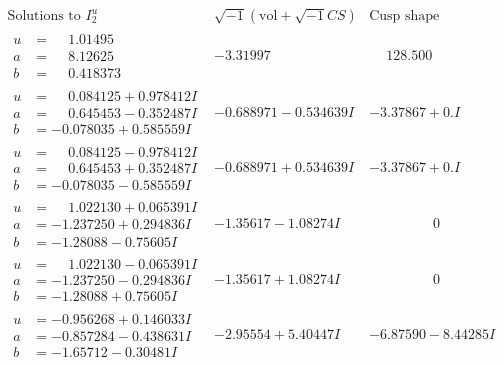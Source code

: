 \documentclass[1p]{elsarticle_modified}
\theoremstyle{definition}
\newcommand{\I}{\sqrt{-1}}
\begin{document}
$$\begin{array}{c|c|c}  
\text{Solutions to }I^u_{2}& \I (\text{vol} + \sqrt{-1}CS) & \text{Cusp shape}\\
 \hline 
\begin{aligned}
u &= \phantom{-}1.01495\phantom{ +0.000000I} \\
a &= \phantom{-}8.12625\phantom{ +0.000000I} \\
b &= \phantom{-}0.418373\phantom{ +0.000000I}\end{aligned}
 & -3.31997\phantom{ +0.000000I} & \phantom{-}128.500\phantom{ +0.000000I} \\ \hline\begin{aligned}
u &= \phantom{-}0.084125 + 0.978412 I \\
a &= \phantom{-}0.645453 - 0.352487 I \\
b &= -0.078035 + 0.585559 I\end{aligned}
 & -0.688971 - 0.534639 I & -3.37867 + 0. I\phantom{ +0.000000I} \\ \hline\begin{aligned}
u &= \phantom{-}0.084125 - 0.978412 I \\
a &= \phantom{-}0.645453 + 0.352487 I \\
b &= -0.078035 - 0.585559 I\end{aligned}
 & -0.688971 + 0.534639 I & -3.37867 + 0. I\phantom{ +0.000000I} \\ \hline\begin{aligned}
u &= \phantom{-}1.022130 + 0.065391 I \\
a &= -1.237250 + 0.294836 I \\
b &= -1.28088 - 0.75605 I\end{aligned}
 & -1.35617 - 1.08274 I & \phantom{-0.000000 } 0 \\ \hline\begin{aligned}
u &= \phantom{-}1.022130 - 0.065391 I \\
a &= -1.237250 - 0.294836 I \\
b &= -1.28088 + 0.75605 I\end{aligned}
 & -1.35617 + 1.08274 I & \phantom{-0.000000 } 0 \\ \hline\begin{aligned}
u &= -0.956268 + 0.146033 I \\
a &= -0.857284 - 0.438631 I \\
b &= -1.65712 - 0.30481 I\end{aligned}
 & -2.95554 + 5.40447 I & -6.87590 - 8.44285 I \\ \hline\begin{aligned}

\end{aligned}
\end{array}$$
\end{document}
